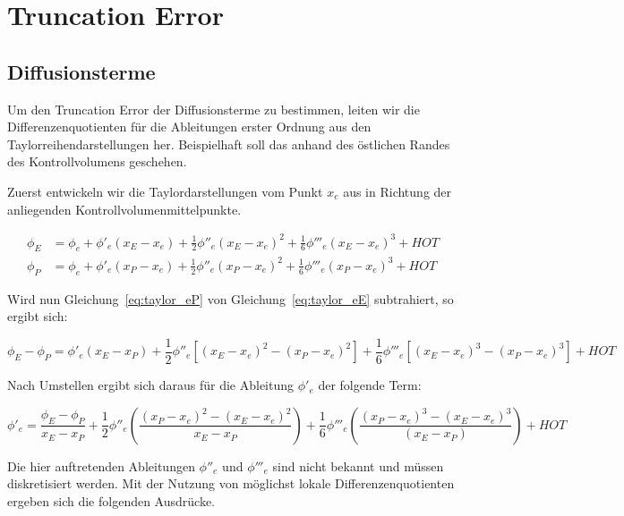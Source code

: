 \documentclass[11pt, ngerman,colorback,accentcolor=tud2d]{tudreport}
\begin{document}
\newcommand{\pder}[2][]{\frac{\partial#1}{\partial#2}}
\newcommand{\pderf}[1]{\frac{\partial f}{\partial#1}}
\newcommand{\pderfs}[1]{\frac{\partial^2 f}{\partial#1}}



\chapter{Truncation Error}
\label{cha:Truncation_Error}
\section{Diffusionsterme}
\label{sec:Diffusionsterme}


Um den Truncation Error der Diffusionsterme zu bestimmen, leiten wir die Differenzenquotienten
für die Ableitungen erster Ordnung aus den Taylorreihendarstellungen her. Beispielhaft
soll das anhand des östlichen Randes des Kontrollvolumens geschehen.

Zuerst entwickeln wir die Taylordarstellungen vom Punkt $x_e$ aus in Richtung der anliegenden
Kontrollvolumenmittelpunkte.

\begin{align}
  \phi_E &= \phi_e + \phi'_e(x_E-x_e)+\frac{1}{2}\phi''_e(x_E-x_e)^2
  +\frac{1}{6}\phi'''_e(x_E-x_e)^3+HOT
  \label{eq:taylor_eE}\\
  \phi_P &= \phi_e + \phi'_e(x_P-x_e)+\frac{1}{2}\phi''_e(x_P-x_e)^2
  +\frac{1}{6}\phi'''_e(x_P-x_e)^3+HOT
  \label{eq:taylor_eP}
\end{align}

Wird nun Gleichung~\eqref{eq:taylor_eP} von Gleichung~\eqref{eq:taylor_eE} subtrahiert, 
so ergibt sich:

\begin{equation*}
  \phi_E-\phi_P=\phi'_e(x_E-x_P)+
  \frac{1}{2}\phi''_e\left[{{(x_E-x_e)}^2-{(x_P-x_e)}^2}\right]+
  \frac{1}{6}\phi'''_e\left[{{(x_E-x_e)}^3-{(x_P-x_e)}^3}\right]+HOT
\end{equation*}

Nach Umstellen ergibt sich daraus für die Ableitung $\phi'_e$ der folgende Term:

\begin{equation}
  \phi'_e = \frac{\phi_E-\phi_P}{x_E-x_P}+\frac{1}{2}\phi''_e
\left({\frac{{(x_P-x_e)}^2-{(x_E-x_e)}^2}{x_E-x_P}}\right)+
\frac{1}{6} \phi'''_e \left({\frac{{(x_P-x_e)}^3-{(x_E-x_e)}^3}{(x_E-x_P)}}\right)+HOT
\end{equation}


Die hier auftretenden Ableitungen $\phi''_e$ und $\phi'''_e$ sind nicht bekannt und 
müssen diskretisiert werden. Mit der Nutzung von
möglichst lokale Differenzenquotienten ergeben sich die folgenden Ausdrücke.
\end{document}
